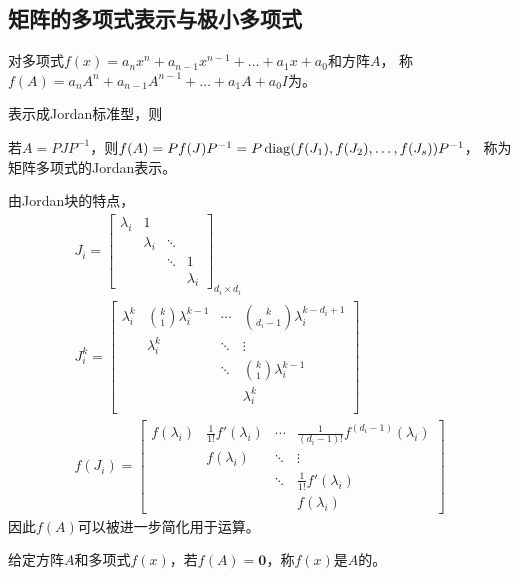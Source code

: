 \subsection{矩阵的多项式表示与极小多项式}

\begin{definition}
    对多项式$f(x)=a_n x^n+a_{n-1} x^{n-1}+\dots+a_1 x+a_0$和方阵$A$，
    称$f(A)=a_n A^n+a_{n-1} A^{n-1} + \dots + a_1 A + a_0 I$为。
\end{definition}

表示成Jordan标准型，则
\begin{definition}
    若$A=PJP^{-1}$，则$f(A)=Pf(J)P^{-1}=P \operatorname{diag}(f(J_1), f(J_2), \dots, f(J_s)) P^{-1}$，
    称为矩阵多项式的Jordan表示。
\end{definition}

由Jordan块的特点，
\begin{gather*}
    J_i =
    \begin{bmatrix}
        \lambda_i & 1 && \\
        & \lambda_i & \ddots & \\
        & & \ddots & 1 \\
        & & & \lambda_i
    \end{bmatrix}_{d_i\times d_i} \\
    J_i^k =
    \begin{bmatrix}
        \lambda_i^k & {k\choose 1}\lambda_i^{k-1} & \cdots & {k \choose d_i-1}\lambda_i^{k-d_i+1} \\
        & \lambda_i^k & \ddots & \vdots \\
        && \ddots & {k\choose 1}\lambda_i^{k-1} \\
        &&& \lambda_i^k \\
    \end{bmatrix} \\
    f(J_i) =
    \begin{bmatrix}
        f(\lambda_i) & \frac{1}{1!}f'(\lambda_i) & \cdots & \frac{1}{(d_i-1)!} f^{(d_i-1)}(\lambda_i) \\
        & f(\lambda_i) & \ddots & \vdots \\
        && \ddots & \frac{1}{1!}f'(\lambda_i) \\
        &&& f(\lambda_i)
    \end{bmatrix}
\end{gather*}
因此$f(A)$可以被进一步简化用于运算。

\begin{definition}[零化多项式]
    给定方阵$A$和多项式$f(x)$，若$f(A)=\bm{0}$，称$f(x)$是$A$的。
\end{definition}

